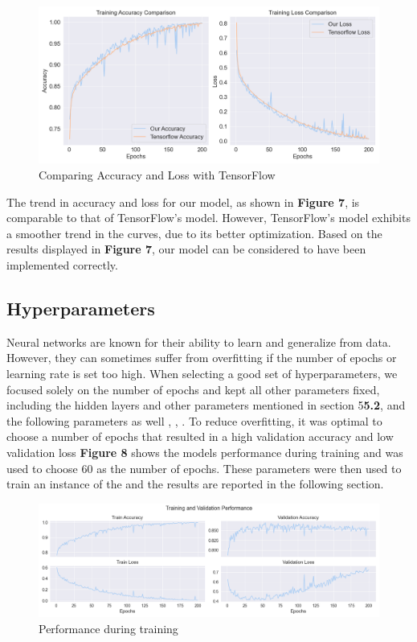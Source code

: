 \begin{figure}[H]
    \centering
    \includegraphics[scale=0.45]{figures_for_report/tensorflow_vs_our}
    \captionsetup{justification=centering,margin=2cm}
    \caption{Comparing Accuracy and Loss with TensorFlow}
\end{figure}

The trend in accuracy and loss for our model, as shown in \textbf{Figure 7}, is comparable to that of TensorFlow's model.
However, TensorFlow's model exhibits a smoother trend in the curves, due to its better optimization.
Based on the results displayed in \textbf{Figure 7}, our model can be considered to have been implemented correctly.

\subsection{Hyperparameters}
Neural networks are known for their ability to learn and generalize from data.
However, they can sometimes suffer from overfitting if the number of epochs or learning rate is set too high.
When selecting a good set of hyperparameters, we focused solely on the number of epochs and kept all other parameters fixed, including the hidden layers and other parameters mentioned in section 5\textbf{5.2}, and the following parameters as well , , .
To reduce overfitting, it was optimal to choose a number of epochs that resulted in a high validation accuracy and low validation loss
\textbf{Figure 8} shows the models performance during training and was used to choose $60$ as the number of epochs.
These parameters were then used to train an instance of the  and the results are reported in the following section.
\begin{figure}[H]
    \centering
    \includegraphics[scale=0.45]{figures_for_report/train_validation_nn_performance}
    \captionsetup{justification=centering,margin=2cm}
    \caption{Performance during training}\label{fig:figure}
\end{figure}

